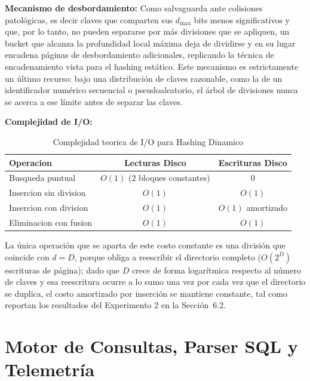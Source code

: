\documentclass[a4paper,12pt]{article}
\begin{document}
\textbf{Mecanismo de desbordamiento:} Como salvaguarda ante colisiones
patológicas, es decir claves que comparten sus $d_{\max}$ bits menos
significativos y que, por lo tanto, no pueden separarse por más divisiones que
se apliquen, un bucket que alcanza la profundidad local máxima deja de dividirse
y en su lugar encadena páginas de desbordamiento adicionales, replicando la
técnica de encadenamiento vista para el hashing estático. Este mecanismo es
estrictamente un último recurso: bajo una distribución de claves razonable, como
la de un identificador numérico secuencial o pseudoaleatorio, el árbol de
divisiones nunca se acerca a ese límite antes de separar las claves.

\textbf{Complejidad de I/O:}
\begin{table}[h]
\centering
\caption{Complejidad teorica de I/O para Hashing Dinamico}
\label{tab:hash_complejidad}
\begin{tabular}{|l|c|c|}
\hline
\textbf{Operacion} & \textbf{Lecturas Disco} & \textbf{Escrituras Disco} \\ \hline
Busqueda puntual & $O(1)$ (2 bloques constantes) & $0$ \\ \hline
Insercion sin division & $O(1)$ & $O(1)$ \\ \hline
Insercion con division & $O(1)$ & $O(1)$ amortizado \\ \hline
Eliminacion con fusion & $O(1)$ & $O(1)$ \\ \hline
\end{tabular}
\end{table}

La única operación que se aparta de este costo constante es una división que
coincide con $d = D$, porque obliga a reescribir el directorio completo
($O(2^{D})$ escrituras de página); dado que $D$ crece de forma logarítmica
respecto al número de claves y esa reescritura ocurre a lo sumo una vez por
cada vez que el directorio se duplica, el costo amortizado por inserción se
mantiene constante, tal como reportan los resultados del Experimento 2 en la
Sección~6.2.

\section{Motor de Consultas, Parser SQL y Telemetría}
\end{document}
